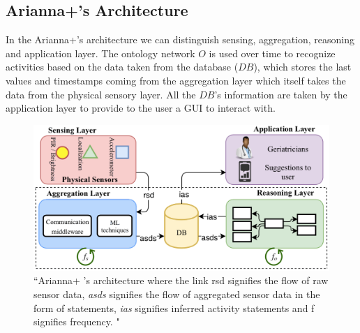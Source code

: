 \documentclass{thesisreport}
\begin{document}
 
 \subsection{Arianna+’s Architecture}
 In the Arianna+'s architecture we can distinguish sensing, aggregation, reasoning and application layer.  
 The ontology network $O$ is used over time to recognize activities based on the data taken from the database ($DB$), which stores the last values and timestamps coming from the aggregation layer which itself takes the data from the physical sensory layer.
 All the $DB$'s information are taken by the application layer to provide to the user a GUI to interact with.  
 
 \begin{figure}[ht]
	\centering
	\includegraphics[width=17cm]{Thesis/data/layers.pdf}
	\caption{``Arianna+ ’s architecture where the link rsd signifies the flow of raw sensor data, \textit{asds} signifies the flow of aggregated sensor data in the form of statements, \textit{ias} signifies inferred activity statements and f signifies frequency. \cite{kareem2018arianna}"}
	\label{fig:layers}
 \end{figure}
 
\end{document}
